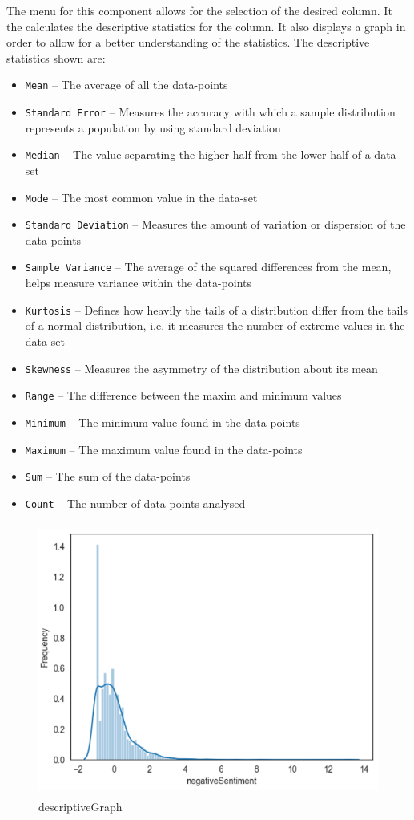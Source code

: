 The menu for this component allows for the selection of the desired column. It the calculates the descriptive statistics for the column. It also displays a graph in order to allow for a better understanding of the statistics. The descriptive statistics shown are:
\begin{itemize}
    \item \texttt{Mean} -- The average of all the data-points
    \item \texttt{Standard Error} -- Measures the accuracy with which a sample distribution represents a population by using standard deviation
    \item \texttt{Median} -- The value separating the higher half from the lower half of a data-set
    \item \texttt{Mode} -- The most common value in the data-set
    \item \texttt{Standard Deviation} -- Measures the amount of variation or dispersion of the data-points
    \item \texttt{Sample Variance} -- The average of the squared differences from the mean, helps measure variance within the data-points
    \item \texttt{Kurtosis} -- Defines how heavily the tails of a distribution differ from the tails of a normal distribution, i.e. it measures the number of extreme values in the data-set
    \item \texttt{Skewness} -- Measures the asymmetry of the distribution about its mean
    \item \texttt{Range} -- The difference between the maxim and minimum values
    \item \texttt{Minimum} -- The minimum value found in the data-points
    \item \texttt{Maximum} -- The maximum value found in the data-points
    \item \texttt{Sum} -- The sum of the data-points
    \item \texttt{Count} -- The number of data-points analysed
\end{itemize}

\begin{figure}[h]
    \centering
    \includegraphics[width=15cm,height=9cm,keepaspectratio]{implementation/descriptiveGraph.png}
    \caption{descriptiveGraph}
    \label{fig:descriptiveGraph}
\end{figure}

